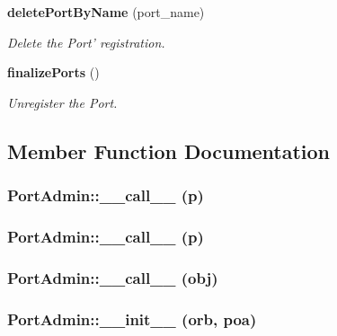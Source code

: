 \begin{CompactItemize}
{\bf delete\-Port\-By\-Name} (port\_\-name)
\begin{CompactList}\small\item\em Delete the Port' registration. \item\end{CompactList}\item 
{\bf finalize\-Ports} ()
\begin{CompactList}\small\item\em Unregister the Port. \item\end{CompactList}\end{CompactItemize}


\subsection{Member Function Documentation}
\subsubsection{\setlength{\rightskip}{0pt plus 5cm}Port\-Admin::\_\-\_\-call\_\-\_\- (p)}\label{classPortAdmin_PortAdmina5}


\subsubsection{\setlength{\rightskip}{0pt plus 5cm}Port\-Admin::\_\-\_\-call\_\-\_\- (p)}\label{classPortAdmin_PortAdmina3}


\subsubsection{\setlength{\rightskip}{0pt plus 5cm}Port\-Admin::\_\-\_\-call\_\-\_\- (obj)}\label{classPortAdmin_PortAdmina1}


\subsubsection{\setlength{\rightskip}{0pt plus 5cm}Port\-Admin::\_\-\_\-init\_\-\_\- (orb, poa)}\label{classPortAdmin_PortAdmina6}


